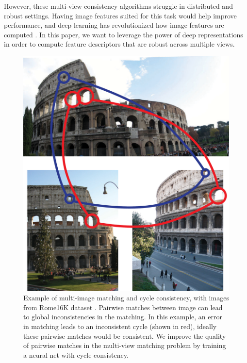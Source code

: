 \documentclass[10pt,twocolumn,letterpaper]{article}
\begin{document}
However, these multi-view consistency algorithms struggle in distributed and robust settings.
Having image features suited for this task would help improve performance, and deep learning has revolutionized how image features are computed \cite{yi2016lift}.
In this paper, we want to leverage the power of deep representations in order to compute feature descriptors that are robust across multiple views.

\begin{figure}[t]
\begin{center}
  \includegraphics[width=0.8\linewidth]{figures-CycleConsistencyBasic-v2.pdf}
\end{center}
  \caption{
    Example of multi-image matching and cycle consistency, with images from Rome16K dataset \cite{li2010location}.
    Pairwise matches between image can lead to global inconsistencies in the matching.
    In this example, an error in matching leads to an inconsistent cycle (shown in red), ideally these pairwise matches would be consistent.
    We improve the quality of pairwise matches in the multi-view matching problem by training a neural net with cycle consistency.
  }
\label{fig:cycconsistex}
\label{fig:onecol}
\end{figure}
\end{document}
